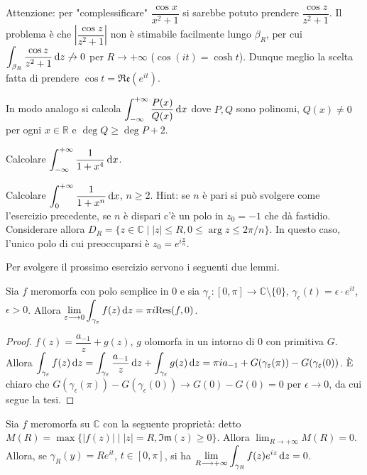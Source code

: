 Attenzione: per "complessificare" $\dfrac{\cos{x}}{x^2+1}$ si sarebbe potuto prendere $\dfrac{\cos{z}}{z^2+1}$.
Il problema è che $\left| \dfrac{\cos{z}}{z^2+1}\right|$ non è stimabile facilmente lungo $\beta_R$, per cui $\displaystyle \int_{\beta_R} \frac{\cos{z}}{z^2+1}\mathop{}\!\mathrm{d} z \not\rightarrow 0$ per $R \longrightarrow +\infty$ ($\cos(it)=\cosh{t}$). Dunque meglio la scelta fatta di prendere $\cos{t}=\mathfrak{Re}(e^{it})$. \marginpar\warningsign

In modo analogo si calcola $\displaystyle \int_{-\infty}^{+\infty} \frac{P(x)}{Q(x)}\mathop{}\!\mathrm{d} x$ dove $P, Q$ sono polinomi, $Q(x) \not=0$ per ogni $x \in \mathbb{R}$ e $\deg{Q} \ge \deg{P}+2$.

\begin{exc}
  Calcolare $\displaystyle \int_{-\infty}^{+\infty} \frac{1}{1+x^4}\mathop{}\!\mathrm{d} x$.
\end{exc}

\begin{exc}
  Calcolare $\displaystyle \int_0^{+\infty} \frac{1}{1+x^n} \mathop{}\!\mathrm{d} x$, $n \ge 2$. Hint: se $n$ è pari si può svolgere come l'esercizio precedente, se $n$ è dispari c'è un polo in $z_0=-1$ che dà fastidio. Considerare allora $D_R=\{z \in \mathbb{C} \mid |z| \le R, 0 \le \arg{z} \le 2\pi/n\}$. In questo caso, l'unico polo di cui preoccuparsi è $z_0=e^{i\frac{\pi}{n}}$.
\end{exc}

Per svolgere il prossimo esercizio servono i seguenti due lemmi.

\begin{lm}
  Sia $f$ meromorfa con polo semplice in $0$ e sia $\gamma_{\epsilon}:[0,\pi] \longrightarrow \mathbb{C}\setminus\{0\}$, $\gamma_{\epsilon}(t)=\epsilon\cdot e^{it}$, $\epsilon>0$. Allora $\displaystyle \lim_{\varepsilon \longrightarrow 0} \int_{\gamma_\varepsilon} f(z)\mathop{}\!\mathrm{d} z=\pi i \text{Res}(f,0)$.
\end{lm}

\begin{proof}
  $f(z)=\dfrac{a_{-1}}{z}+g(z)$, $g$ olomorfa in un intorno di $0$ con primitiva $G$. Allora $\displaystyle \int_{\gamma_\varepsilon} f(z)\mathop{}\!\mathrm{d} z=\int_{\gamma_\varepsilon} \dfrac{a_{-1}}{z}\mathop{}\!\mathrm{d} z+\int_{\gamma_\varepsilon} g(z)\mathop{}\!\mathrm{d} z=\pi i a_{-1}+G(\gamma_\varepsilon(\pi))-G(\gamma_\varepsilon(0))$.
  È chiaro che $G(\gamma_\epsilon(\pi))-G(\gamma_\epsilon(0)) \longrightarrow G(0)-G(0)=0$ per $\epsilon \longrightarrow 0$, da cui segue la tesi.
\end{proof}

\begin{lm}
  Sia $f$ meromorfa su $\mathbb{C}$ con la seguente proprietà: detto $M(R)=\max\{|f(z)| \mid |z|=R, \mathfrak{Im}(z) \ge 0\}$. Allora $\displaystyle \lim_{R \longrightarrow +\infty} M(R)=0$. Allora, se $\gamma_R(y)=Re^{it}$, $t \in [0,\pi]$, si ha $\displaystyle \lim_{R \longrightarrow +\infty} \int_{\gamma_R} f(z)e^{iz}\mathop{}\!\mathrm{d} z=0$.
\end{lm}


